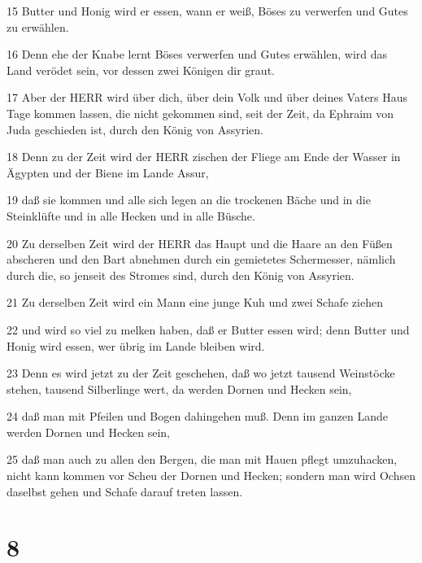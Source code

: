 \par 15 Butter und Honig wird er essen, wann er weiß, Böses zu verwerfen und Gutes zu erwählen.
\par 16 Denn ehe der Knabe lernt Böses verwerfen und Gutes erwählen, wird das Land verödet sein, vor dessen zwei Königen dir graut.
\par 17 Aber der HERR wird über dich, über dein Volk und über deines Vaters Haus Tage kommen lassen, die nicht gekommen sind, seit der Zeit, da Ephraim von Juda geschieden ist, durch den König von Assyrien.
\par 18 Denn zu der Zeit wird der HERR zischen der Fliege am Ende der Wasser in Ägypten und der Biene im Lande Assur,
\par 19 daß sie kommen und alle sich legen an die trockenen Bäche und in die Steinklüfte und in alle Hecken und in alle Büsche.
\par 20 Zu derselben Zeit wird der HERR das Haupt und die Haare an den Füßen abscheren und den Bart abnehmen durch ein gemietetes Schermesser, nämlich durch die, so jenseit des Stromes sind, durch den König von Assyrien.
\par 21 Zu derselben Zeit wird ein Mann eine junge Kuh und zwei Schafe ziehen
\par 22 und wird so viel zu melken haben, daß er Butter essen wird; denn Butter und Honig wird essen, wer übrig im Lande bleiben wird.
\par 23 Denn es wird jetzt zu der Zeit geschehen, daß wo jetzt tausend Weinstöcke stehen, tausend Silberlinge wert, da werden Dornen und Hecken sein,
\par 24 daß man mit Pfeilen und Bogen dahingehen muß. Denn im ganzen Lande werden Dornen und Hecken sein,
\par 25 daß man auch zu allen den Bergen, die man mit Hauen pflegt umzuhacken, nicht kann kommen vor Scheu der Dornen und Hecken; sondern man wird Ochsen daselbst gehen und Schafe darauf treten lassen.

\chapter{8}

